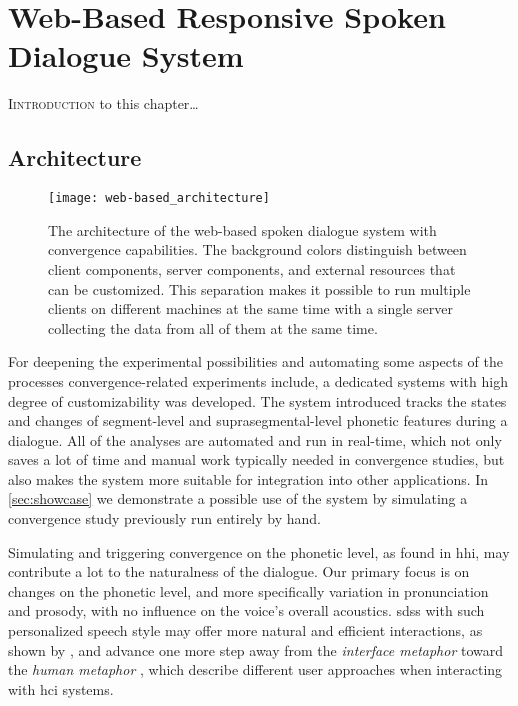 \chapter{Web-Based Responsive Spoken Dialogue System}
\label{chap:web-based_responsive_spoken_dialogue_system}

\lettrine{I}{introduction} to this chapter\ldots

\pagebreak

\section{Architecture}
\label{sec:architecture_web-based}

\begin{figure}[t]
	\centering
	\texttt{[image: web-based\_architecture]}
	\caption[Architecture of a web-based system with convergence capabilities] {
		The architecture of the web-based spoken dialogue system with convergence capabilities.
		The background colors distinguish between client components, server components, and external resources that can be customized.
		This separation makes it possible to run multiple clients on different machines at the same time with a single server collecting the data from all of them at the same time.
	}
	\label{fig:web-based_architecture}
\end{figure}

For deepening the experimental possibilities and automating some aspects of the processes convergence-related experiments include, a dedicated systems with high degree of customizability was developed.
The system introduced tracks the states and changes of segment-level and suprasegmental-level phonetic features during a dialogue.
All of the analyses are automated and run in real-time, which not only saves a lot of time and manual work typically needed in convergence studies, but also makes the system more suitable for integration into other applications.
In \cref{sec:showcase} we demonstrate a possible use of the system by simulating a convergence study previously run entirely by hand.

Simulating and triggering convergence on the phonetic level, as found in \ac{hhi}, may contribute a lot to the naturalness of the dialogue.
Our primary focus is on changes on the phonetic level, and more specifically variation in pronunciation and prosody, with no influence on the voice's overall acoustics.
\Acp{sds} with such personalized speech style may offer more natural and efficient interactions, as shown by \citet{Porzel2006entrainment}, and advance one more step away from the \emph{interface metaphor} \citep{Edlund2006twofaces} toward the \emph{human metaphor} \citep{Carlson2006humanlike}, which describe different user approaches when interacting with \ac{hci} systems.

